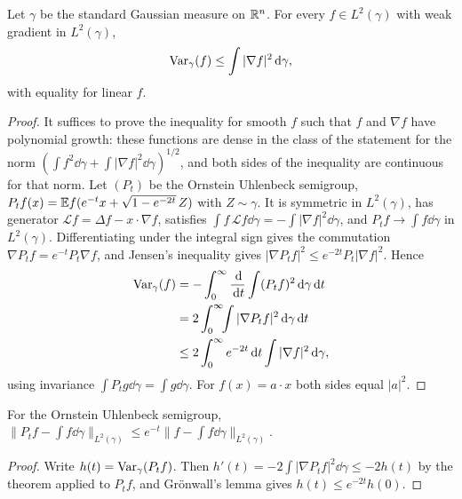 \begin{theorem}
\label{thm:gaussian_poincare}
Let $\gamma$ be the standard Gaussian measure on $\mathbb{R}^n$. For every $f\in L^2(\gamma)$ with weak gradient in $L^2(\gamma)$,
\[
\mathrm{Var}_\gamma(f)\leq \int |\nabla f|^2 \,\mathrm{d}\gamma,
\]
with equality for linear $f$.
\end{theorem}

\begin{proof}
It suffices to prove the inequality for smooth $f$ such that $f$ and $\nabla f$ have polynomial growth: these functions are dense in the class of the statement for the norm $(\int f^2\dd\gamma+\int|\nabla f|^2\dd\gamma)^{1/2}$, and both sides of the inequality are continuous for that norm. Let $(P_t)$ be the Ornstein Uhlenbeck semigroup, $P_t f(x) = \mathbb{E} f(e^{-t}x + \sqrt{1-e^{-2t}}\,Z)$ with $Z\sim\gamma$. It is symmetric in $L^2(\gamma)$, has generator $\mathcal{L}f = \Delta f - x\cdot\nabla f$, satisfies $\int f\,\mathcal{L}f\dd\gamma = -\int|\nabla f|^2\dd\gamma$, and $P_t f\to\int f\dd\gamma$ in $L^2(\gamma)$. Differentiating under the integral sign gives the commutation $\nabla P_t f = e^{-t}P_t\nabla f$, and Jensen's inequality gives $|\nabla P_t f|^2\leq e^{-2t}P_t|\nabla f|^2$. Hence
\[
\begin{aligned}\mathrm{Var}_\gamma(f) &= -\int_0^\infty \frac{\,\mathrm{d}}{\,\mathrm{d} t}\int (P_t f)^2\,\mathrm{d}\gamma\,\mathrm{d} t\\
&= 2\int_0^\infty\!\!\int |\nabla P_t f|^2\,\mathrm{d}\gamma\,\mathrm{d} t\\
&\leq 2\int_0^\infty e^{-2t}\,\mathrm{d} t\int |\nabla f|^2\,\mathrm{d}\gamma,\end{aligned}
\]
using invariance $\int P_t g\dd\gamma = \int g\dd\gamma$. For $f(x) = a\cdot x$ both sides equal $|a|^2$.
\end{proof}

\begin{corollary}
For the Ornstein Uhlenbeck semigroup, $\|P_t f - \int f\dd\gamma\|_{L^2(\gamma)}\leq e^{-t}\|f - \int f\dd\gamma\|_{L^2(\gamma)}$.
\end{corollary}

\begin{proof}
Write $h(t) = \mathrm{Var}_\gamma(P_t f)$. Then $h'(t) = -2\int |\nabla P_t f|^2\dd\gamma\leq -2h(t)$ by the theorem applied to $P_t f$, and Gr\"onwall's lemma gives $h(t)\leq e^{-2t}h(0)$.
\end{proof}

